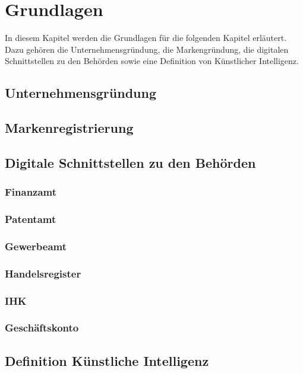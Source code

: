 \newpage

\section{Grundlagen} \label{grundlagen}
In diesem Kapitel werden die Grundlagen für die folgenden Kapitel erläutert. Dazu gehören die Unternehmensgründung, die Markengründung, die digitalen Schnittstellen zu den Behörden sowie eine Definition von Künstlicher Intelligenz.


\subsection{Unternehmensgründung} \label{unternehmensgruendung}


\subsection{Markenregistrierung} \label{markenregistrierung}


\subsection{Digitale Schnittstellen zu den Behörden} \label{digitaleBehoerden}

\subsubsection{Finanzamt} \label{finanzamt}

\subsubsection{Patentamt} \label{patentamt}

\subsubsection{Gewerbeamt} \label{gewerbeamt}

\subsubsection{Handelsregister} \label{handelsregister}

\subsubsection{IHK} \label{ihk}

\subsubsection{Geschäftskonto} \label{geschaeftskonto}


\subsection{Definition Künstliche Intelligenz} \label{wasIstKI}

